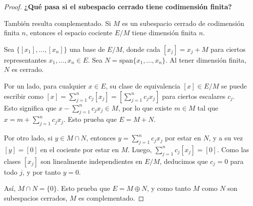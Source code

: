\documentclass{article}
\theoremstyle{definition}
\begin{document}
\begin{proof}
	\textbf{¿Qué pasa si el subespacio cerrado tiene codimensión finita?}

	También resulta complementado. Si \(M\) es un subespacio cerrado de codimensión finita \(n\), entonces el espacio cociente \(E/M\) tiene dimensión finita \(n\).

	Sea \( \{[x_1], \dots, [x_n]\} \) una base de \(E/M\), donde cada \([x_j] = x_j + M\) para ciertos representantes \(x_1, \dots, x_n \in E\). Sea \(N = \text{span}\{x_1, \dots, x_n\} \). Al tener dimensión finita, \(N\) es cerrado.

	Por un lado, para cualquier \(x \in E\), su clase de equivalencia \([x] \in E/M\) se puede escribir como \([x] = \sum_{j=1}^n c_j [x_j] = \left[ \sum_{j=1}^n c_j x_j \right]\) para ciertos escalares \(c_j\). Esto significa que \(x - \sum_{j=1}^n c_j x_j \in M\), por lo que existe \(m \in M\) tal que \(x = m + \sum_{j=1}^n c_j x_j\). Esto prueba que \(E = M + N\).

	Por otro lado, si \(y \in M \cap N\), entonces \(y = \sum_{j=1}^n c_j x_j\) por estar en \(N\), y a su vez \([y] = [0]\) en el cociente por estar en \(M\). Luego, \(\sum_{j=1}^n c_j [x_j] = [0]\). Como las clases \([x_j]\) son linealmente independientes en \(E/M\), deducimos que \(c_j = 0\) para todo \(j\), y por tanto \(y = 0\).

	Así, \( M \cap N = \{0\} \). Esto prueba que \(E = M \oplus N\), y como tanto \(M\) como \(N\) son subespacios cerrados, \(M\) es complementado.
\end{proof}

\vspace{0.5cm}
\end{document}
